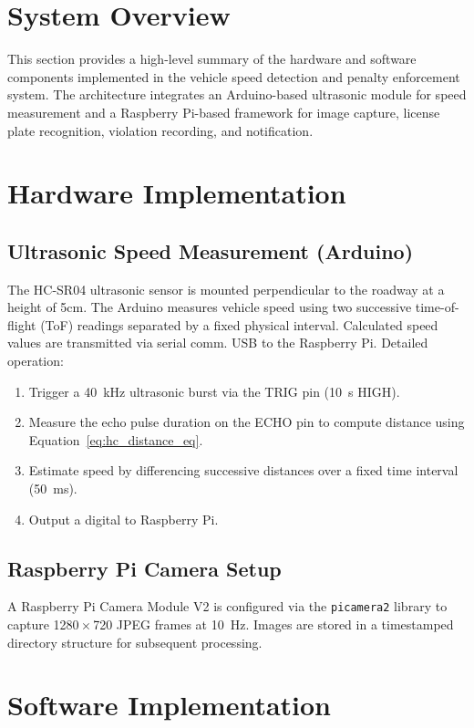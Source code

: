 
\section{System Overview}
This section provides a high-level summary of the hardware and software components implemented in the vehicle speed detection and penalty enforcement system. The architecture integrates an Arduino-based ultrasonic module for speed measurement and a Raspberry Pi-based framework for image capture, license plate recognition, violation recording, and notification.

\section{Hardware Implementation}

\subsection{Ultrasonic Speed Measurement (Arduino)}
The HC-SR04 ultrasonic sensor is mounted perpendicular to the roadway at a height of 5cm. The Arduino measures vehicle speed using two successive time-of-flight (ToF) readings separated by a fixed physical interval. Calculated speed values are transmitted via serial comm. USB to the Raspberry Pi. Detailed operation:
\begin{enumerate}
  \item Trigger a 40~kHz ultrasonic burst via the TRIG pin (10~\textmu s HIGH).
  \item Measure the echo pulse duration on the ECHO pin to compute distance using Equation~\eqref{eq:hc_distance_eq}.
  \item Estimate speed by differencing successive distances over a fixed time interval (50~ms).
  \item Output a digital to Raspberry Pi.
\end{enumerate}

\subsection{Raspberry Pi Camera Setup}
A Raspberry Pi Camera Module V2 is configured via the \texttt{picamera2} library to capture 1280\,$\times$\,720 JPEG frames at 10~Hz. Images are stored in a timestamped directory structure for subsequent processing.

\section{Software Implementation}
